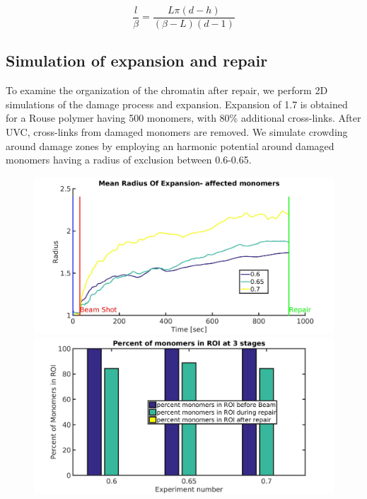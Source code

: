\documentclass[12pt]{report}
\begin{document}
		\begin{equation}\label{eq:ratioOfDNALengthToRoiRadius}
	       \frac{l}{\beta} = \frac{L\pi(d-h)}{(\beta-L)(d-1)}
		\end{equation}				
						
		\subsection{Simulation of expansion and repair}\label{subsection:SimulationOfExpansionAndRepair}
		To examine the organization of the chromatin after repair, we perform 2D simulations of the damage process and expansion. Expansion of 1.7 is obtained for a Rouse polymer having 500 monomers, with 80\% additional cross-links. 		
		After UVC, cross-links from damaged monomers are removed. We simulate crowding around damage zones by employing an harmonic potential around damaged monomers having a radius of exclusion between 0.6-0.65.
		
		
				
	\begin{figure}[H]
	\includegraphics[width=0.5\linewidth, height=0.3\textheight]{Images/Simulations/meanRadiusOfExpansionAffected}
	\includegraphics[width=0.5\linewidth, height=0.3\textheight]{Images/Simulations/percentOfMonomersInROI}
	\caption{}
	\label{fig:meanRadiusOfExpansionAffected}
	\end{figure}
\end{document}
